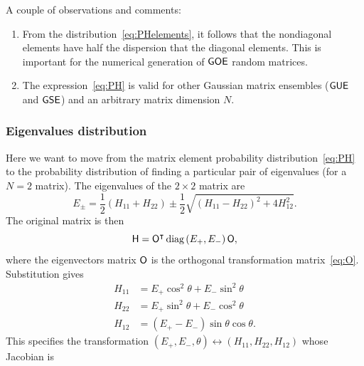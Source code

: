 \documentclass[a4paper,11pt,twoside]{article}
\begin{document}
            A couple of observations and comments:
            \begin{enumerate}
                \item 
                    From the distribution~\eqref{eq:PHelements}, it follows that the nondiagonal elements have half the dispersion that the diagonal elements.
                    This is important for the numerical generation of $\mathsf{GOE}$ random matrices.

                \item
                    The expression~\eqref{eq:PH} is valid for other Gaussian matrix ensembles ($\mathsf{GUE}$ and $\mathsf{GSE}$) and an arbitrary matrix dimension $N$.    
            \end{enumerate}

        \subsubsection{Eigenvalues distribution}
            Here we want to move from the matrix element probability distribution~\eqref{eq:PH} to the probability distribution of finding a particular pair of eigenvalues (for a $N=2$ matrix).
            The eigenvalues of the $2\times2$ matrix are
            \begin{equation}
                E_{\pm}=\frac{1}{2}\left(H_{11}+H_{22}\right)\pm\frac{1}{2}\sqrt{\left(H_{11}-H_{22}\right)^{2}+4H_{12}^{2}}.
            \end{equation}
            The original matrix is then
            \begin{equation}
                \mathsf{H}={\mathsf{O}}^{\intercal}\,\text{diag}\left(E_{+},E_{-}\right)\mathsf{O},
            \end{equation}
            where the eigenvectors matrix $\mathsf{O}$ is the orthogonal transformation matrix~\eqref{eq:O}.
            Substitution gives
            \begin{align}
                H_{11}&=E_{+}\cos^{2}\theta+E_{-}\sin^{2}\theta\nonumber\\
                H_{22}&=E_{+}\sin^{2}\theta+E_{-}\cos^{2}\theta\\
                H_{12}&=\left(E_{+}-E_{-}\right)\sin\theta\cos\theta.\nonumber
            \end{align}
            This specifies the transformation $\left(E_{+},E_{-},\theta\right)\leftrightarrow\left(H_{11},H_{22},H_{12}\right)$ whose Jacobian is
\end{document}
